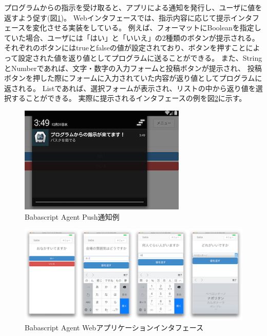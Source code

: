 プログラムからの指示を受け取ると、アプリによる通知を発行し、ユーザに値を返すよう促す(図\ref{fig:client-push-notification})。
Webインタフェースでは、指示内容に応じて提示インタフェースを変化させる実装をしている。
例えば、フォーマットにBooleanを指定していた場合、ユーザには「はい」と「いいえ」の2種類のボタンが提示される。
それぞれのボタンにはtrueとfalseの値が設定されており、ボタンを押すことによって設定された値を返り値としてプログラムに送ることができる。
また、StringとNumberであれば、文字・数字の入力フォームと投稿ボタンが提示され、
投稿ボタンを押した際にフォームに入力されていた内容が返り値としてプログラムに返される。
Listであれば、選択フォームが表示され、リストの中から返り値を選択することができる。
実際に提示されるインタフェースの例を図\ref{fig:client_format_list}に示す。

\begin{figure}[htbp]
  \begin{center}
  \includegraphics[width=.7\linewidth,bb=0 0 300 192]{images/client-push-notification.png}
  \end{center}
  \caption{Babascript Agent Push通知例}
  \label{fig:client-push-notification}
\end{figure}

\begin{figure}[htbp]
  \begin{center}
  \includegraphics[width=.8\linewidth,bb=0 0 500 209]{images/client_format_list.png}
  \end{center}
  \caption{Babascript Agent Webアプリケーションインタフェース}
  \label{fig:client_format_list}
\end{figure}


